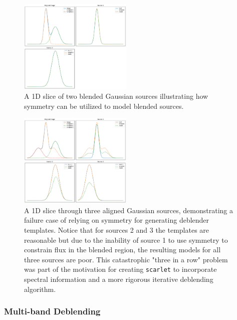 \begin{figure}[htb]
    \centering
    \includegraphics[width=0.48\textwidth]{simple_1D_blend.pdf}
    \caption{A 1D slice of two blended Gaussian sources illustrating how symmetry can be utilized to model blended sources.}
    \label{fig:simple_blend}
\end{figure}

\begin{figure}[htb]
    \centering
    \includegraphics[width=0.48\textwidth]{complex_1D_blend.pdf}
    \caption{A 1D slice through three aligned Gaussian sources, demonstrating a failure case of relying on symmetry for generating deblender templates. Notice that for sources 2 and 3 the templates are reasonable but due to the inability of source 1 to use symmetry to constrain flux in the blended region, the resulting models for all three sources are poor. This catastrophic "three in a row" problem was part of the motivation for creating \texttt{scarlet} to incorporate spectral information and a more rigorous iterative deblending algorithm.}
    \label{fig:complex_blend}
\end{figure}

\subsubsection{Multi-band Deblending}
\label{sec:multiband_deblending}

